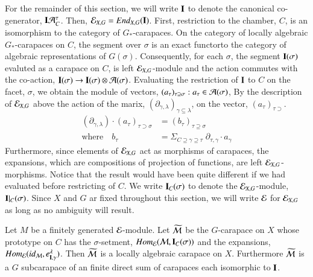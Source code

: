 For the remainder of this section, we will write $\mathbf{I}$ to denote the canonical co-generator, $\mathbf{I}\mathcal{A}_{C}^{\tau}$. Then, $\mathcal{E}_{X, G} = End_{X, G}(\mathbf{I})$. First, restriction to the chamber, $C$, is an isomorphism to the category of $G_{*}$-carapaces. On the category of locally algebraic $G_{*}$-carapaces on $C$, the segment over $\sigma$ is an exact functor\pageoriginale to the category of algebraic representations of $G(\sigma)$. Consequently, for each $\sigma$, the segment $\mathbf{I}(\sigma)$ evaluted as a carapace on $C$, is left $\mathcal{E}_{X, G}$-module and the action commutes with the co-action, $\mathbf{I}(\sigma) \rightarrow \mathbf{I}(\sigma) \otimes \mathcal{A}(\sigma)$. Evaluating the restriction of $\mathbf{I}$ to $C$ on the facet, $\sigma$, we obtain the module of vectors, $(a_{\tau})_{\tau \supseteq \sigma} : a_{\tau} \in \mathcal{A}(\sigma)$, By the description of $\mathcal{E}_{X,G}$ above the action of the marix, $(\partial_{\gamma, \lambda})_{\gamma \subseteq \lambda}$, on the vector, $(a_{\tau})_{\tau \supset}$.
\begin{equation*}
\begin{aligned}\label{chap6-eq-15.3}
(\partial_{\gamma,\lambda}) \cdot (a_{\tau})_{\tau \supset \sigma} &= (b_{\tau})_{\tau \supseteq \sigma}\\
\text{where} \quad b_{\tau} &= \Sigma_{C \supseteq \gamma \supseteq \tau}\; \partial_{\tau, \gamma} \cdot a_{\gamma}
\end{aligned}\tag{15.3}
\end{equation*}
Furthermore, since elements of $\mathcal{E}_{X, G}$ act as morphisms of carapaces, the expansions, which are compositions of projection of functions, are left $\mathcal{E}_{X,G}$-morphisms. Notice that the result would have been quite different if we had evaluated before restricting of $C$. We write $\mathbf{I}_{C}(\sigma)$ to denote the $\mathcal{E}_{X, G}$-module, $\mathbf{I}|_{C}(\sigma)$. Since $X$ and $G$ ar fixed throughout this section, we will write $\mathcal{E}$ for $\mathcal{E}_{X, G}$ as long as no ambiguity will result.

\setcounter{definition}{3}
\begin{seclem}\label{chap6-lemma-15.4}
Let $M$ be a finitely generated $\mathcal{E}$-module. Let $\widetilde{\mathcal{M}}$ be the $G$-carapace on $X$ whose prototype on $C$ has the $\sigma$-setment, $Hom_{\mathcal{E}}(\mathcal{M}, \mathbf{I}_{C}(\sigma))$ and the expansions, $Hom_{\mathcal{E}}(id_{\mathcal{M}}, e_{\mathbf{I}, \gamma}^{\lambda})$. Then $\widetilde{\mathcal{M}}$ is a locally algebraic carapace on $X$. Furthermore $\widetilde{\mathcal{M}}$ is a $G$ subcarapace of an finite direct sum of carapaces each isomorphic to $\mathbf{I}$.
\end{seclem}

